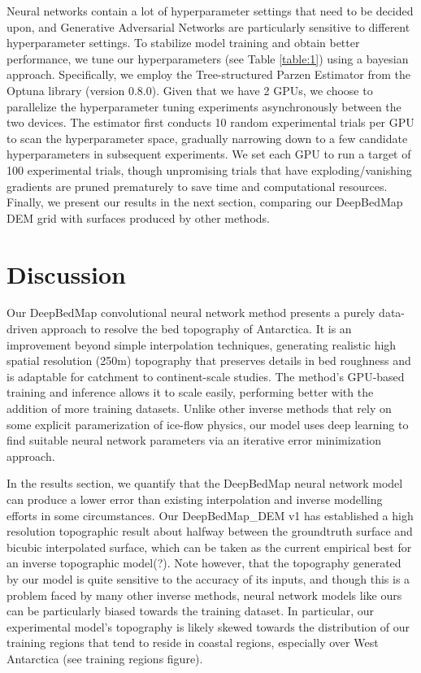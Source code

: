 \documentclass[tc, manuscript]{copernicus}
\begin{document}
Neural networks contain a lot of hyperparameter settings that need to be decided upon, and Generative Adversarial Networks are particularly sensitive to different hyperparameter settings.
To stabilize model training and obtain better performance, we tune our hyperparameters (see Table \ref{table:1}) using a bayesian approach.
Specifically, we employ the Tree-structured Parzen Estimator \citep{BergstraAlgorithmsHyperparameterOptimization2011} from the Optuna library (version 0.8.0).
Given that we have 2 GPUs, we choose to parallelize the hyperparameter tuning experiments asynchronously between the two devices.
The estimator first conducts 10 random experimental trials per GPU to scan the hyperparameter space, gradually narrowing down to a few candidate hyperparameters in subsequent experiments.
We set each GPU to run a target of 100 experimental trials, though unpromising trials that have exploding/vanishing gradients are pruned prematurely to save time and computational resources.
Finally, we present our results in the next section, comparing our DeepBedMap DEM grid with surfaces produced by other methods.


\section{Discussion}

Our DeepBedMap convolutional neural network method presents a purely data-driven approach to resolve the bed topography of Antarctica.
It is an improvement beyond simple interpolation techniques, generating realistic high spatial resolution (250m) topography that preserves details in bed roughness and is adaptable for catchment to continent-scale studies.
The method's GPU-based training and inference allows it to scale easily, performing better with the addition of more training datasets.
Unlike other inverse methods that rely on some explicit paramerization of ice-flow physics, our model uses deep learning to find suitable neural network parameters via an iterative error minimization approach.

In the results section, we quantify that the DeepBedMap neural network model can produce a lower error than existing interpolation and inverse modelling efforts in some circumstances.
Our DeepBedMap\_DEM v1 has established a high resolution topographic result about halfway between the groundtruth surface and bicubic interpolated surface, which can be taken as the current empirical best for an inverse topographic model(?).
Note however, that the topography generated by our model is quite sensitive to the accuracy of its inputs, and though this is a problem faced by many other inverse methods, neural network models like ours can be particularly biased towards the training dataset.
In particular, our experimental model's topography is likely skewed towards the distribution of our training regions that tend to reside in coastal regions, especially over West Antarctica (see training regions figure).
\end{document}
